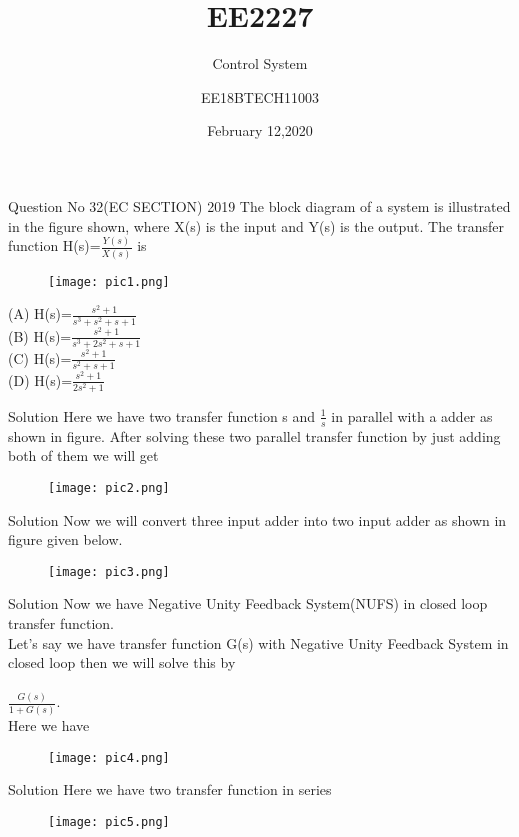 \documentclass{beamer}
\title[Short Title]{EE2227}
\subtitle{Control System}
\author{EE18BTECH11003}
\date{February 12,2020}
\begin{document}
\begin{frame}
\titlepage{}
\end{frame}

\begin{frame}{Question No 32(EC SECTION) 2019}
The block diagram of a system is illustrated in the figure shown, where X(s) is the input and Y(s) is the output. The transfer function H(s)=$\frac{Y(s)}{X(s)}$ is 
\begin{figure}
\texttt{[image: pic1.png]}
\end{figure}
(A) H(s)=$\frac{s^2+1}{s^3+s^2+s+1}$ \\
(B) H(s)=$\frac{s^2+1}{s^3+2s^2+s+1}$ \\
(C) H(s)=$\frac{s^2+1}{s^2+s+1}$ \\
(D) H(s)=$\frac{s^2+1}{2s^2+1}$
\end{frame}

\begin{frame}{Solution}
Here we have two transfer function s and $\frac{1}{s}$ in parallel with a adder as shown in figure.
After solving these two parallel transfer function by just adding both of them we will get
\begin{figure}
\texttt{[image: pic2.png]}
\end{figure}
\end{frame}

\begin{frame}{Solution}
Now we will convert three input adder into two input adder as shown in figure given below.
\begin{figure}
\texttt{[image: pic3.png]}
\end{figure}
\end{frame}

\begin{frame}{Solution}
Now we have Negative Unity Feedback System(NUFS) in closed loop transfer function. \\Let's say we have transfer function G(s) with Negative Unity Feedback System in closed loop then we will solve this by\\             \\ $\frac{G(s)}{1+G(s)}$.
\\Here we have
\begin{figure}
\texttt{[image: pic4.png]}
\end{figure}
\end{frame}

\begin{frame}{Solution}
Here we have two transfer function in series 
\begin{figure}
\texttt{[image: pic5.png]}
\end{figure}
\end{frame}
\end{document}
